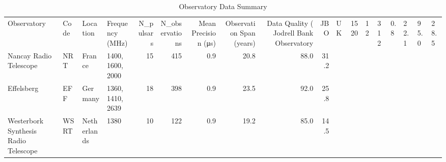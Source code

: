 \begin{table}
\caption{Observatory Data Summary}
\label{tab:observatory_data}
\begin{tabular}{llllrrrrrr}
\toprule
Observatory & Code & Location & Frequency (MHz) & N_pulsars & N_observations & Mean Precision (μs) & Observation Span (years) & Data Quality (%
\midrule
Jodrell Bank Observatory & JBO & UK & 1520 & 12 & 312 & 0.8 & 22.1 & 95.0 & 28.5 \\
Nancay Radio Telescope & NRT & France & 1400, 1600, 2000 & 15 & 415 & 0.9 & 20.8 & 88.0 & 31.2 \\
Effelsberg & EFF & Germany & 1360, 1410, 2639 & 18 & 398 & 0.9 & 23.5 & 92.0 & 25.8 \\
Westerbork Synthesis Radio Telescope & WSRT & Netherlands & 1380 & 10 & 122 & 0.9 & 19.2 & 85.0 & 14.5 \\
\bottomrule
\end{tabular}
\end{table}
